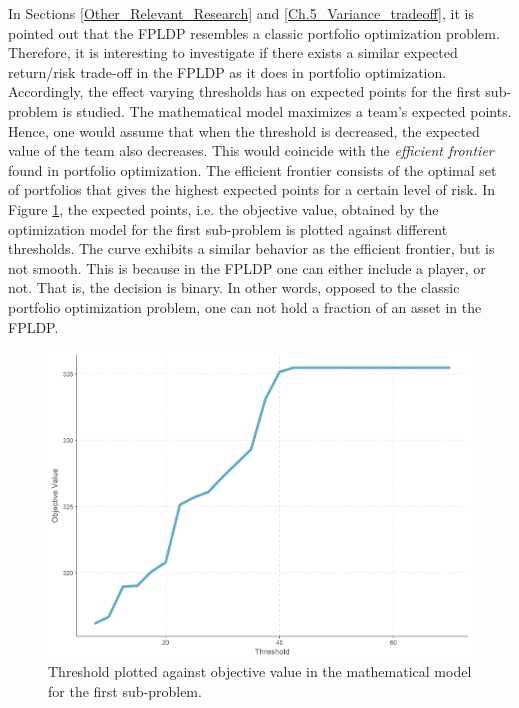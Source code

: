 \newpar

\newpar

In Sections \ref{Other_Relevant_Research} and  \ref{Ch.5_Variance_tradeoff}, it is pointed out that the FPLDP resembles a classic portfolio optimization problem. Therefore, it is interesting to investigate if there exists a similar expected return/risk trade-off in the FPLDP as it does in portfolio optimization. Accordingly, the effect varying thresholds has on expected points for the first sub-problem is studied. The mathematical model maximizes a team's expected points. Hence, one would assume that when the threshold is decreased, the expected value of the team also decreases. This would coincide with the \textit{efficient frontier} found in portfolio optimization. The efficient frontier consists of the optimal set of portfolios that gives the highest expected points for a certain level of risk. In Figure \ref{fig:threshold_GW1}, the expected points, i.e. the objective value, obtained by the optimization model for the first sub-problem is plotted against different thresholds. The curve exhibits a similar behavior as the efficient frontier, but is not smooth. This is because in the FPLDP one can either include a player, or not. That is, the decision is binary. In other words, opposed to the classic portfolio optimization problem, one can not hold a fraction of an asset in the FPLDP. 
\newpar

 
\begin{figure}[H]
    \centering
    \includegraphics[scale=0.5]{fig/chapter_7/GW1_var.png}
    \caption{Threshold plotted against objective value in the mathematical model for the first sub-problem.}
\label{fig:threshold_GW1}    
\end{figure}%


